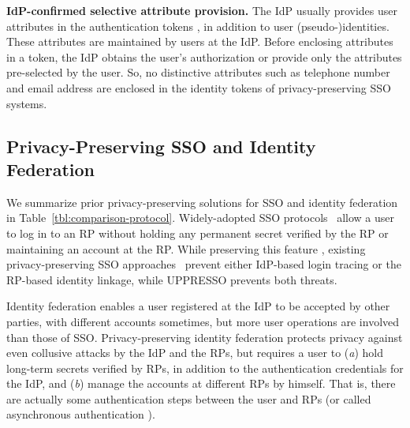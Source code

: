 \noindent\textbf{IdP-confirmed selective attribute provision.}
The IdP usually provides user attributes in the authentication tokens \cite{OpenIDConnect,rfc6749,SAML}, in addition to user (pseudo-)identities.
These attributes are maintained by users at the IdP.
Before enclosing attributes in a token, the IdP obtains the user's authorization or provide only the attributes pre-selected by the user.
So, no distinctive attributes such as telephone number and email address are enclosed in the identity tokens of privacy-preserving SSO systems.

%



\subsection{Privacy-Preserving SSO and Identity Federation}
\label{subsec-solutions}

We summarize prior privacy-preserving solutions for SSO and identity federation in Table~\ref{tbl:comparison-protocol}. 
Widely-adopted SSO protocols~\cite{OpenIDConnect,rfc6749,SAML,SAMLIdentifier} allow a user to log in to an RP
without holding any permanent secret verified by the RP or maintaining an account at the RP.
While preserving this feature%
, existing privacy-preserving SSO approaches~\cite{BrowserID,SPRESSO,NIST2017draft} prevent either IdP-based login tracing or the RP-based identity linkage, while UPPRESSO prevents both threats.

Identity federation enables a user registered at the IdP to be accepted by other parties,
            with different accounts sometimes,
        but more user operations are involved than those of SSO.
Privacy-preserving identity federation \cite{ELPASSO,UnlimitID,hyperledge-idemix,PseudoID,Opaak}
    protects privacy against even collusive attacks by the IdP and the RPs,
    but requires a user to (\emph{a}) hold long-term secrets verified by RPs,
            in addition to the authentication credentials for the IdP,
                and (\emph{b}) manage the accounts at different RPs by himself.
That is, there are actually some authentication steps between the user and RPs (or called asynchronous authentication \cite{ELPASSO}).


